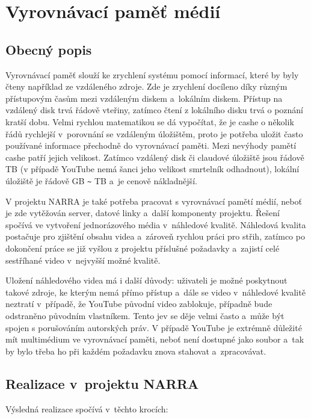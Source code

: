 \section{Vyrovnávací paměť médií}
\subsection{Obecný popis}
\par Vyrovnávací paměť\cite{sap} slouží ke zrychlení systému pomocí  informací, které by byly čteny například ze vzdáleného zdroje. Zde je zrychlení docíleno díky různým přístupovým časům mezi vzdáleným diskem a~lokálním diskem. Přístup na vzdálený disk trvá řádově vteřiny, zatímco čtení z lokálního disku trvá o poznání kratší dobu. Velmi rychlou matematikou se dá vypočítat, že je cashe o několik řádů rychlejší v~porovnání se vzdáleným úložištěm, proto je potřeba uložit často používané informace přechodně do vyrovnávací paměti. Mezi nevýhody pamětí cashe patří jejich velikost. Zatímco vzdálený disk či claudové úložiště jsou řádově TB (v případě YouTube nemá šanci jeho velikost smrtelník odhadnout), lokální úložiště je řádově GB \verb|~| TB a~je cenově nákladnější.
\par V projektu NARRA je také potřeba pracovat s vyrovnávací pamětí médií, neboť je zde vytěžován server, datové linky a~další komponenty projektu. Řešení spočívá ve vytvoření jednorázového média v~náhledové kvalitě. Náhledová kvalita postačuje pro zjištění obsahu videa a~zároveň rychlou práci pro střih, zatímco po dokončení práce se již vyšlou z projektu příslušné požadavky a~zajistí celé sestříhané video v~nejvyšší možné kvalitě.
\par Uložení náhledového videa má i další důvody: uživateli je možné poskytnout takové zdroje, ke kterým nemá přímo přístup a~dále se video v~náhledové kvalitě neztratí v~případě, že YouTube původní video zablokuje, případně bude odstraněno původním vlastníkem. Tento jev se děje velmi často a~může být spojen s porušováním autorských práv. V případě YouTube je extrémně důležité mít multimédium ve vyrovnávací paměti, neboť není dostupné jako soubor a~tak by bylo třeba ho při každém požadavku znova stahovat a~zpracovávat.

\subsection{Realizace v~projektu NARRA}
\par Výsledná realizace spočívá v~těchto krocích:

